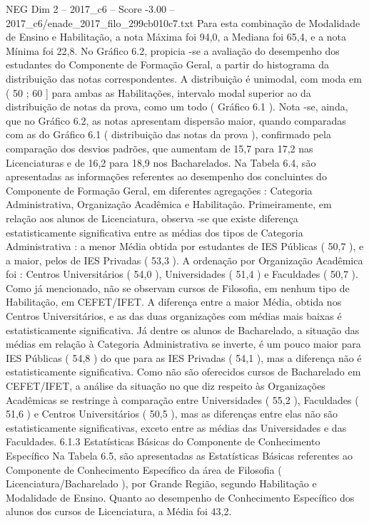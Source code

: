 \begin{textsample}{NEG Dim 2 – 2017\_c6 – Score -3.00 – 2017\_c6/enade\_2017\_filo\_299cb010c7.txt}
Para esta combinação de Modalidade de Ensino e Habilitação, a nota Máxima foi 94,0, a Mediana foi 65,4, e a nota Mínima foi 22,8.
No Gráfico 6.2, propicia -se a avaliação do desempenho dos estudantes do Componente de Formação Geral, a partir do histograma da distribuição das notas correspondentes.
A distribuição é unimodal, com moda em ( 50 ; 60 ] para ambas as Habilitações, intervalo modal superior ao da distribuição de notas da prova, como um todo ( Gráfico 6.1 ).
Nota -se, ainda, que no Gráfico 6.2, as notas apresentam dispersão maior, quando comparadas com as do Gráfico 6.1 ( distribuição das notas da prova ), confirmado pela comparação dos desvios padrões, que aumentam de 15,7 para 17,2 nas Licenciaturas e de 16,2 para 18,9 nos Bacharelados.
Na Tabela 6.4, são apresentadas as informações referentes ao desempenho dos concluintes do Componente de Formação Geral, em diferentes agregações : Categoria Administrativa, Organização Acadêmica e Habilitação.
Primeiramente, em relação aos alunos de Licenciatura, observa -se que existe diferença estatisticamente significativa entre as médias dos tipos de Categoria Administrativa : a menor Média obtida por estudantes de IES Públicas ( 50,7 ), e a maior, pelos de IES Privadas ( 53,3 ).
A ordenação por Organização Acadêmica foi : Centros Universitários ( 54,0 ), Universidades ( 51,4 ) e Faculdades ( 50,7 ).
Como já mencionado, não se observam cursos de Filosofia, em nenhum tipo de Habilitação, em CEFET/IFET.
A diferença entre a maior Média, obtida nos Centros Universitários, e as das duas organizações com médias mais baixas é estatisticamente significativa.
Já dentre os alunos de Bacharelado, a situação das médias em relação à Categoria Administrativa se inverte, é um pouco maior para IES Públicas ( 54,8 ) do que para as IES Privadas ( 54,1 ), mas a diferença não é estatisticamente significativa.
Como não são oferecidos cursos de Bacharelado em CEFET/IFET, a análise da situação no que diz respeito às Organizações Acadêmicas se restringe à comparação entre Universidades ( 55,2 ), Faculdades ( 51,6 ) e Centros Universitários ( 50,5 ), mas as diferenças entre elas não são estatisticamente significativas, exceto entre as médias das Universidades e das Faculdades. 6.1.3 Estatísticas Básicas do Componente de Conhecimento Específico Na Tabela 6.5, são apresentadas as Estatísticas Básicas referentes ao Componente de Conhecimento Específico da área de Filosofia ( Licenciatura/Bacharelado ), por Grande Região, segundo Habilitação e Modalidade de Ensino.
Quanto ao desempenho de Conhecimento Específico dos alunos dos cursos de Licenciatura, a Média foi 43,2.

\end{textsample}
